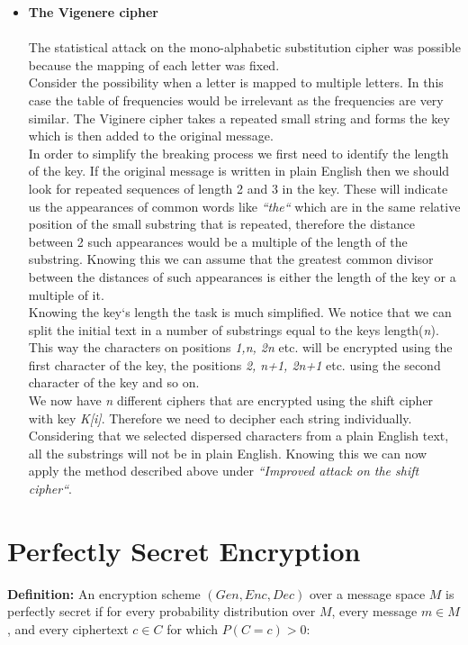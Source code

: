 \begin{itemize}
    \item \textbf{The Vigenere cipher}\\\\
The statistical attack on the mono-alphabetic substitution cipher was possible because the
mapping of each letter was fixed.\\
Consider the possibility when a letter is mapped to multiple letters. In this case the table of
frequencies would be irrelevant as the frequencies are very similar.
The Viginere cipher takes a repeated small string and forms the key which is then added to the
original message.\\
In order to simplify the breaking process we first need to identify the length of the key. If the
original message is written in plain English then we should look for repeated sequences of length
2 and 3 in the key. These will indicate us the appearances of common words like \textit{``the``} which
are in the same relative position of the small substring that is repeated, therefore the distance
between 2 such appearances would be a multiple of the length of the substring. Knowing this
we can assume that the greatest common divisor between the distances of such appearances is
either the length of the key or a multiple of it.\\
Knowing the key`s length the task is much simplified. We notice that we can split the initial text
in a number of substrings equal to the keys length(\textit{n}). This way the characters on positions \textit{1,n, 2n} etc. will be encrypted using the first character of the key, the positions \textit{2, n+1, 2n+1} etc. using the second character of the key and so on.\\
We now have \textit{n} different ciphers that are encrypted using the shift cipher with key \textit{K[i]}.
Therefore we need to decipher each string individually. Considering that we selected dispersed
characters from a plain English text, all the substrings will not be in plain English. Knowing this
we can now apply the method described above under \textit{``Improved attack on the shift cipher``}.
\end{itemize}


\section{Perfectly Secret Encryption}
\textbf{Definition:} An encryption scheme $(Gen,Enc,Dec)$ over a message space $M$ is perfectly secret if for every probability distribution over $M$, every message $m \in M$, and every ciphertext $c \in C$ for which $P(C=c)>0:$

